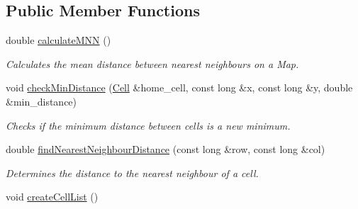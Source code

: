 \subsection*{Public Member Functions}
\begin{DoxyCompactItemize}
\item 
double \hyperlink{class_landscape_metrics_calculator_a34f344e3282eead2091fe8ccb32e6d48}{calculate\+M\+NN} ()
\begin{DoxyCompactList}\small\item\em Calculates the mean distance between nearest neighbours on a Map. \end{DoxyCompactList}\item 
void \hyperlink{class_landscape_metrics_calculator_a16bde8469f437abc21602eedb979e5e3}{check\+Min\+Distance} (\hyperlink{struct_cell}{Cell} \&home\+\_\+cell, const long \&x, const long \&y, double \&min\+\_\+distance)
\begin{DoxyCompactList}\small\item\em Checks if the minimum distance between cells is a new minimum. \end{DoxyCompactList}\item 
double \hyperlink{class_landscape_metrics_calculator_a9dd4cde4aad066b3b204553718a63a98}{find\+Nearest\+Neighbour\+Distance} (const long \&row, const long \&col)
\begin{DoxyCompactList}\small\item\em Determines the distance to the nearest neighbour of a cell. \end{DoxyCompactList}\item 
void \hyperlink{class_landscape_metrics_calculator_a084eea2435b7d15049873ae4613b0307}{create\+Cell\+List} ()\hypertarget{class_landscape_metrics_calculator_a084eea2435b7d15049873ae4613b0307}{}\label{class_landscape_metrics_calculator_a084eea2435b7d15049873ae4613b0307}


\end{DoxyCompactItemize}
